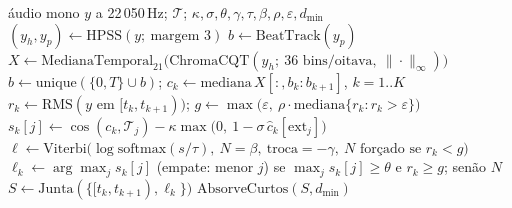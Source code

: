 \begin{algorithm}[t]
  \caption{Reconhecimento de acordes por faixa. $\mathcal{T}$: templates binários normalizados em $\ell_2$ (24 ou 60 colunas).}
  \label{alg:pipeline}
  \begin{algorithmic}[1]
    \REQUIRE áudio mono $y$ a 22\,050\,Hz; $\mathcal{T}$; $\kappa, \sigma, \theta, \gamma, \tau, \beta, \rho, \varepsilon, d_{\min}$
    \STATE $(y_h, y_p) \leftarrow \mathrm{HPSS}(y;\ \text{margem } 3)$
    \STATE $b \leftarrow \mathrm{BeatTrack}(y_p)$ 
    \STATE $X \leftarrow \mathrm{MedianaTemporal}_{21}\big(\mathrm{ChromaCQT}(y_h;\ 36 \text{ bins/oitava},\ \|\cdot\|_\infty)\big)$
    \STATE $b \leftarrow \mathrm{unique}(\{0, T\} \cup b)$; \quad $c_k \leftarrow \mathrm{mediana}\,X[:, b_k{:}b_{k+1}]$, $k = 1..K$
    \STATE $r_k \leftarrow \mathrm{RMS}(y \text{ em } [t_k, t_{k+1}))$; \quad $g \leftarrow \max\big(\varepsilon,\ \rho \cdot \mathrm{mediana}\{r_k : r_k > \varepsilon\}\big)$
      \STATE $s_k[j] \leftarrow \cos(c_k, \mathcal{T}_j) - \kappa \max\big(0,\ 1 - \sigma\, \hat{c}_k[\mathrm{ext}_j]\big)$ 
    \ENDFOR
      \STATE $\ell \leftarrow \mathrm{Viterbi}\big(\log\mathrm{softmax}(s/\tau),\ N{=}\beta,\ \text{troca}{=}{-\gamma},\ N \text{ forçado se } r_k < g\big)$
    \ELSE
      \STATE $\ell_k \leftarrow \arg\max_j s_k[j]$ (empate: menor $j$) se $\max_j s_k[j] \ge \theta$ e $r_k \ge g$; senão $N$
    \ENDIF
    \STATE $S \leftarrow \mathrm{Junta}(\{[t_k, t_{k+1}), \ell_k\})$ 
    \RETURN $\mathrm{AbsorveCurtos}(S, d_{\min})$ 
  \end{algorithmic}
\end{algorithm}
